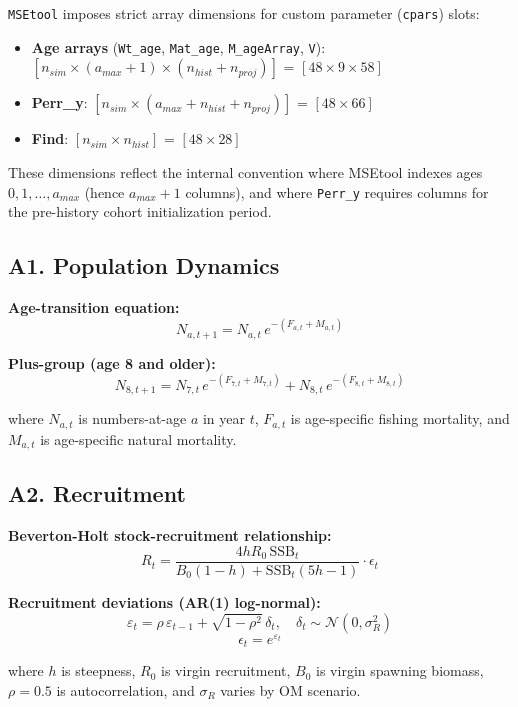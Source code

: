 \documentclass[
]{article}
\providecommand{\tightlist}{%
  \setlength{\itemsep}{0pt}\setlength{\parskip}{0pt}}
\begin{document}
\texttt{MSEtool} imposes strict array dimensions for custom parameter (\texttt{cpars}) slots:

\begin{itemize}
\tightlist
\item
  \textbf{Age arrays} (\texttt{Wt\_age}, \texttt{Mat\_age}, \texttt{M\_ageArray}, \texttt{V}): \([n_{sim} \times (a_{max}+1) \times (n_{hist} + n_{proj})]\) = \([48 \times 9 \times 58]\)
\item
  \textbf{Perr\_y}: \([n_{sim} \times (a_{max} + n_{hist} + n_{proj})]\) = \([48 \times 66]\)
\item
  \textbf{Find}: \([n_{sim} \times n_{hist}]\) = \([48 \times 28]\)
\end{itemize}

These dimensions reflect the internal convention where MSEtool indexes ages \(0, 1, \ldots, a_{max}\) (hence \(a_{max}+1\) columns), and where \texttt{Perr\_y} requires columns for the pre-history cohort initialization period.

\hypertarget{a1.-population-dynamics}{%
\subsection{A1. Population Dynamics}\label{a1.-population-dynamics}}

\textbf{Age-transition equation:}
\[N_{a,t+1} = N_{a,t} \, e^{-(F_{a,t} + M_{a,t})}\]

\textbf{Plus-group (age 8 and older):}
\[N_{8,t+1} = N_{7,t} \, e^{-(F_{7,t} + M_{7,t})} + N_{8,t} \, e^{-(F_{8,t} + M_{8,t})}\]

where \(N_{a,t}\) is numbers-at-age \(a\) in year \(t\), \(F_{a,t}\) is age-specific fishing mortality, and \(M_{a,t}\) is age-specific natural mortality.

\hypertarget{a2.-recruitment}{%
\subsection{A2. Recruitment}\label{a2.-recruitment}}

\textbf{Beverton-Holt stock-recruitment relationship:}
\[R_t = \frac{4 h R_0 \, \text{SSB}_t}{B_0(1-h) + \text{SSB}_t(5h-1)} \cdot \epsilon_t\]

\textbf{Recruitment deviations (AR(1) log-normal):}
\[\varepsilon_t = \rho \, \varepsilon_{t-1} + \sqrt{1 - \rho^2} \, \delta_t, \quad \delta_t \sim \mathcal{N}(0, \sigma_R^2)\]
\[\epsilon_t = e^{\varepsilon_t}\]

where \(h\) is steepness, \(R_0\) is virgin recruitment, \(B_0\) is virgin spawning biomass, \(\rho = 0.5\) is autocorrelation, and \(\sigma_R\) varies by OM scenario.
\end{document}
